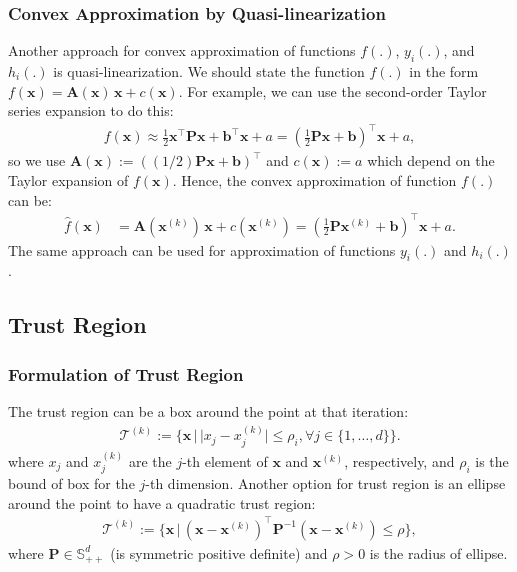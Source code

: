 \documentclass[lang=cn,10pt]{gorgeousnbook}
\numberwithin{equation}{section}%
\numberwithin{figure}{section}%
\begin{document}
\subsubsection{Convex Approximation by Quasi-linearization}

Another approach for convex approximation of functions $f(.)$, $y_i(.)$, and $h_i(.)$ is quasi-linearization.
We should state the function $f(.)$ in the form $f(\boldsymbol{x}) = \boldsymbol{A}(\boldsymbol{x})\, \boldsymbol{x} + c(\boldsymbol{x})$. 
For example, we can use the second-order Taylor series expansion to do this:
\begin{align*}
f(\boldsymbol{x}) \approx \frac{1}{2} \boldsymbol{x}^\top \boldsymbol{P} \boldsymbol{x} + \boldsymbol{b}^\top \boldsymbol{x} + a = (\frac{1}{2} \boldsymbol{P} \boldsymbol{x} + \boldsymbol{b})^\top \boldsymbol{x} + a,
\end{align*}
so we use $\boldsymbol{A}(\boldsymbol{x}) := ((1/2) \boldsymbol{P} \boldsymbol{x} + \boldsymbol{b})^\top$ and $c(\boldsymbol{x}) := a$ which depend on the Taylor expansion of $f(\boldsymbol{x})$. 
Hence, the convex approximation of function $f(.)$ can be:
\begin{align}
\widehat{f}(\boldsymbol{x}) &= \boldsymbol{A}(\boldsymbol{x}^{(k)})\, \boldsymbol{x} + c(\boldsymbol{x}^{(k)}) = (\frac{1}{2} \boldsymbol{P} \boldsymbol{x}^{(k)} + \boldsymbol{b})^\top \boldsymbol{x} + a.
\end{align}
The same approach can be used for approximation of functions $y_i(.)$ and $h_i(.)$.

\subsection{Trust Region}

\subsubsection{Formulation of Trust Region}

The trust region can be a box around the point at that iteration:
\begin{align}
\mathcal{T}^{(k)} := \{\boldsymbol{x}\, |\, |x_j - x_j^{(k)}| \leq \rho_i, \forall j \in \{1, \dots, d\}\}.
\end{align}
where $x_j$ and $x_j^{(k)}$ are the $j$-th element of $\boldsymbol{x}$ and $\boldsymbol{x}^{(k)}$, respectively, and $\rho_i$ is the bound of box for the $j$-th dimension. 
Another option for trust region is an ellipse around the point to have a quadratic trust region:
\begin{align}
\mathcal{T}^{(k)} := \{\boldsymbol{x}\, |\, (\boldsymbol{x} - \boldsymbol{x}^{(k)})^\top \boldsymbol{P}^{-1} (\boldsymbol{x} - \boldsymbol{x}^{(k)}) \leq \rho\},
\end{align}
where $\boldsymbol{P} \in \mathbb{S}_{++}^d$ (is symmetric positive definite) and $\rho > 0$ is the radius of ellipse.
\end{document}
